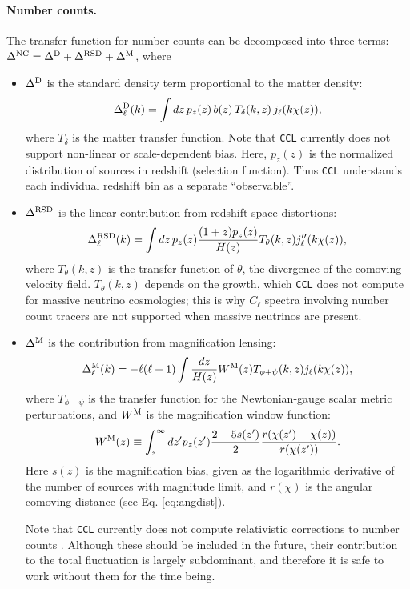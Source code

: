 \documentclass[\docopts]{\docclass}
\begin{document}
\paragraph{\bf Number counts.} The transfer function for number counts can be decomposed into three terms: $\Delta^{\rm NC}=\Delta^{\rm D}+\Delta^{\rm RSD}+\Delta^{\rm M}$, where
\begin{itemize}
  \item $\Delta^{\rm D}$ is the standard density term proportional to the matter density:
        \begin{equation}
          \Delta^{\rm D}_\ell(k)=\int dz\,p_z(z)\,b(z)\,T_\delta(k,z)\,j_\ell(k\chi(z)),
        \end{equation}
        where $T_\delta$ is the matter transfer function. Note that {\tt CCL} currently does not support non-linear or scale-dependent bias. Here, $p_z(z)$ is the normalized distribution of sources in redshift (selection function). Thus {\tt CCL} understands each individual redshift bin as a separate ``observable''.
  \item $\Delta^{\rm RSD}$ is the linear contribution from redshift-space distortions:
        \begin{equation}
          \Delta^{\rm RSD}_\ell(k)=\int dz\,p_z(z)\frac{(1+z) p_z(z)}{H(z)}T_\theta(k,z) j_\ell''(k\chi(z)),
        \end{equation}
        where $T_\theta(k,z)$ is the transfer function of $\theta$, the divergence of the comoving velocity field. $T_\theta(k,z)$ depends on the growth, which {\tt CCL} does not compute for massive neutrino cosmologies; this is why $C_\ell$ spectra involving number count tracers are not supported when massive neutrinos are present.
  \item $\Delta^{\rm M}$ is the contribution from magnification lensing:
        \begin{equation}
          \Delta_\ell^{\rm M}(k)=-\ell(\ell+1)\int \frac{dz}{H(z)} W^{\rm M}(z) T_{\phi+\psi}(k,z) j_\ell(k\chi(z)),
        \end{equation}
        where $T_{\phi+\psi}$ is the transfer function for the Newtonian-gauge scalar metric perturbations, and $W^{\rm M}$ is the magnification window function:
        \begin{equation}
           W^{\rm M}(z)\equiv\int_z^\infty dz' p_z(z')\frac{2-5s(z')}{2}\frac{r(\chi(z')-\chi(z))}{r(\chi(z'))}.
        \end{equation}
        Here $s(z)$ is the magnification bias, given as the logarithmic derivative of the number of sources with magnitude limit, and $r(\chi)$ is the angular comoving distance (see Eq. \ref{eq:angdist}).

        Note that {\tt CCL} currently does not compute relativistic corrections to number counts \cite{2011PhRvD..84d3516C,2011PhRvD..84f3505B}. Although these should be included in the future, their contribution to the total fluctuation is largely subdominant, and therefore it is safe to work without them for the time being.
\end{itemize}
\end{document}
